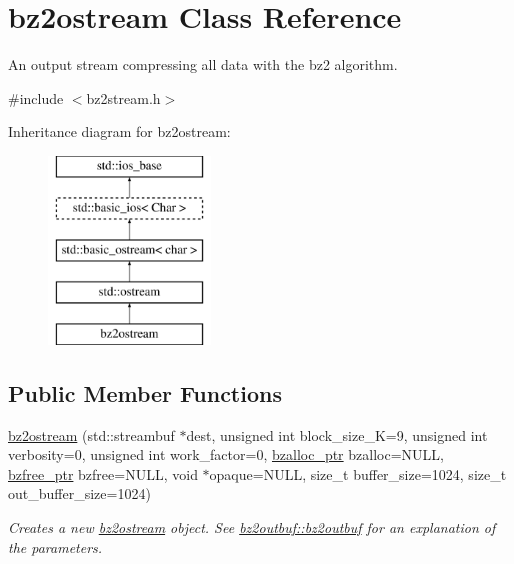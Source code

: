 \hypertarget{classbz2ostream}{}\section{bz2ostream Class Reference}
\label{classbz2ostream}


An output stream compressing all data with the bz2 algorithm.  




{\ttfamily \#include $<$bz2stream.\+h$>$}

Inheritance diagram for bz2ostream\+:\begin{figure}[H]
\begin{center}
\leavevmode
\includegraphics[height=5.000000cm]{classbz2ostream}
\end{center}
\end{figure}
\subsection*{Public Member Functions}
\begin{DoxyCompactItemize}
\item 
\hyperlink{classbz2ostream_abec3e4e8fc51c61ce2b5a8272fc93434}{bz2ostream} (std\+::streambuf $\ast$dest, unsigned int block\+\_\+size\+\_\+K=9, unsigned int verbosity=0, unsigned int work\+\_\+factor=0, \hyperlink{bz2stream_8h_ad84a886ecf0c0c00445cdd219beb6a7b}{bzalloc\+\_\+ptr} bzalloc=N\+U\+L\+L, \hyperlink{bz2stream_8h_a3ae1e0ffde629a32e954abecc8cd7bb2}{bzfree\+\_\+ptr} bzfree=N\+U\+L\+L, void $\ast$opaque=N\+U\+L\+L, size\+\_\+t buffer\+\_\+size=1024, size\+\_\+t out\+\_\+buffer\+\_\+size=1024)
\begin{DoxyCompactList}\small\item\em Creates a new \hyperlink{classbz2ostream}{bz2ostream} object. See \hyperlink{classbz2outbuf_ad907143431be210070e941c963df0f14}{bz2outbuf\+::bz2outbuf} for an explanation of the parameters. \end{DoxyCompactList}\end{DoxyCompactItemize}
